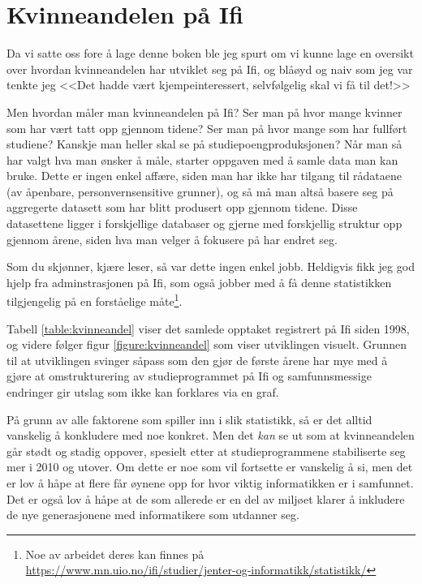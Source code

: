 \chapter{Kvinneandelen på Ifi}

\label{chap:kvinneandelen}

\author{Skrevet av Arne Hassel, med god hjelp fra administrasjonen på Ifi ved Eli Berge}

Da vi satte oss fore å lage denne boken ble jeg spurt om vi kunne lage en oversikt over hvordan kvinneandelen har utviklet seg på Ifi, og blåøyd og naiv som jeg var tenkte jeg <<Det hadde vært kjempeinteressert, selvfølgelig skal vi få til det!>> 

Men hvordan måler man kvinneandelen på Ifi? Ser man på hvor mange kvinner som har vært tatt opp gjennom tidene? Ser man på hvor mange som har fullført studiene? Kanskje man heller skal se på studiepoengproduksjonen? Når man så har valgt hva man ønsker å måle, starter oppgaven med å samle data man kan bruke. Dette er ingen enkel affære, siden man har ikke har tilgang til rådataene (av åpenbare, personvernsensitive grunner), og så må man altså basere seg på aggregerte datasett som har blitt produsert opp gjennom tidene. Disse datasettene ligger i forskjellige databaser og gjerne med forskjellig struktur opp gjennom årene, siden hva man velger å fokusere på har endret seg.

Som du skjønner, kjære leser, så var dette ingen enkel jobb. Heldigvis fikk jeg god hjelp fra adminstrasjonen på Ifi, som også jobber med å få denne statistikken tilgjengelig på en forståelige måte\footnote{Noe av arbeidet deres kan finnes på \url{https://www.mn.uio.no/ifi/studier/jenter-og-informatikk/statistikk/}}.

Tabell \ref{table:kvinneandel} viser det samlede opptaket registrert på Ifi siden 1998, og videre følger figur \ref{figure:kvinneandel} som viser utviklingen visuelt. Grunnen til at utviklingen svinger såpass som den gjør de første årene har mye med å gjøre at omstrukturering av studieprogrammet på Ifi og samfunnsmessige endringer gir utslag som ikke kan forklares via en graf.

På grunn av alle faktorene som spiller inn i slik statistikk, så er det alltid vanskelig å konkludere med noe konkret. Men det \textit{kan} se ut som at kvinneandelen går stødt og stadig oppover, spesielt etter at studieprogrammene stabiliserte seg mer i 2010 og utover. Om dette er noe som vil fortsette er vanskelig å si, men det er lov å håpe at flere får øynene opp for hvor viktig informatikken er i samfunnet. Det er også lov å håpe at de som allerede er en del av miljøet klarer å inkludere de nye generasjonene med informatikere som utdanner seg.

